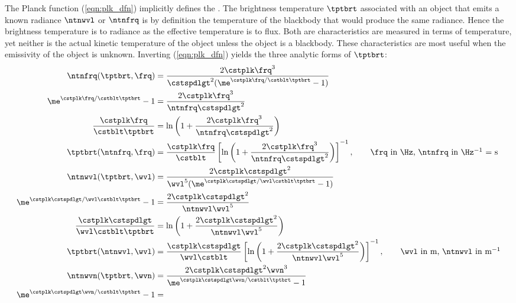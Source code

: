 \documentclass[12pt]{article}
\begin{document}
The Planck function (\ref{eqn:plk_dfn}) implicitly defines the
.
The brightness temperature $\tptbrt$ associated with an object
that emits a known radiance $\ntnwvl$ or $\ntnfrq$ is by definition the temperature
of the blackbody that would produce the same radiance.
Hence the brightness temperature is to radiance as the effective
temperature is to flux.
Both are characteristics are measured in terms of temperature, yet
neither is the actual kinetic temperature of the object unless the
object is a blackbody.
These characteristics are most useful when the emissivity of the
object is unknown.
Inverting (\ref{eqn:plk_dfn}) yields the three analytic forms of
$\tptbrt$: 
\begin{subequations}
\label{eqn:tpt_brt_dfn}
\begin{align}
\label{eqn:tpt_brt_frq_dfn}
\ntnfrq(\tptbrt,\frq) & = \frac{2 \cstplk \frq^{3}}{\cstspdlgt^{2} 
( \me^{\cstplk \frq / \cstblt \tptbrt} - 1)} \nonumber \\
\me^{\cstplk \frq / \cstblt \tptbrt} - 1 & =
\frac{2 \cstplk \frq^{3}}{\ntnfrq \cstspdlgt^{2}} \nonumber \\
\frac{\cstplk \frq}{\cstblt \tptbrt} & =
\ln \left( 1 + \frac{ 2 \cstplk \frq^{3}}{\ntnfrq \cstspdlgt^{2}} \right) \nonumber \\
\tptbrt(\ntnfrq,\frq) & = \frac{\cstplk \frq}{\cstblt}
\left[ \ln \left( 1 + \frac{ 2 \cstplk \frq^{3}}{\ntnfrq \cstspdlgt^{2}} \right) \right]^{-1},
\qquad \mbox{\frq\ in \Hz, \ntnfrq\ in \Hz$^{-1}$ = s} \\
\label{eqn:tpt_brt_wvl_dfn}
\ntnwvl(\tptbrt,\wvl) & = \frac{2 \cstplk \cstspdlgt^{2}}{\wvl^{5} 
( \me^{\cstplk \cstspdlgt / \wvl \cstblt \tptbrt} - 1)} \nonumber \\
\me^{\cstplk \cstspdlgt / \wvl \cstblt \tptbrt} - 1 & =
\frac{2 \cstplk \cstspdlgt^{2}} {\ntnwvl \wvl^{5}} \nonumber \\
\frac{\cstplk \cstspdlgt}{\wvl \cstblt \tptbrt} & =
\ln \left( 1 + \frac{2 \cstplk \cstspdlgt^{2}}{\ntnwvl \wvl^{5}} \right) \nonumber \\
\tptbrt(\ntnwvl,\wvl) & = \frac{\cstplk \cstspdlgt}{\wvl \cstblt}
\left[ \ln \left( 1 + \frac{2 \cstplk \cstspdlgt^{2}}{\ntnwvl \wvl^{5}} \right) \right]^{-1},
\qquad \mbox{\wvl\ in m, \ntnwvl\ in m$^{-1}$} \\ 
\label{eqn:tpt_brt_wvn_dfn}
\ntnwvn(\tptbrt,\wvn) & = \frac{2 \cstplk \cstspdlgt^{2} \wvn^{3}}
{\me^{\cstplk \cstspdlgt \wvn / \cstblt \tptbrt} - 1} \nonumber \\
\me^{\cstplk \cstspdlgt \wvn / \cstblt \tptbrt} - 1 & =

\end{align}
\end{subequations}
\end{document}
